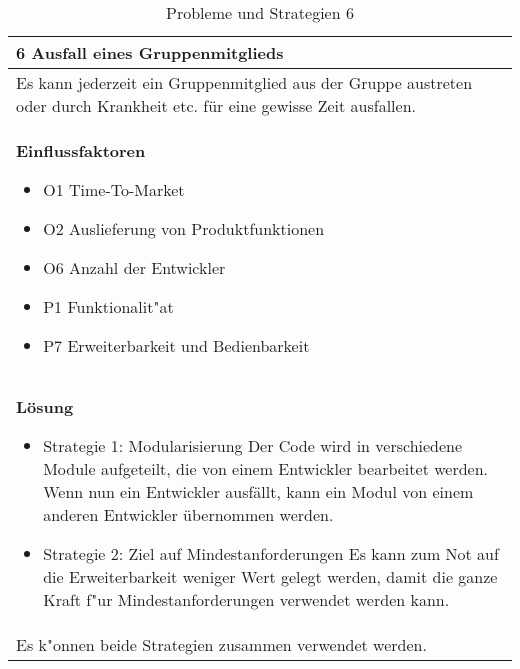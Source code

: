 \begin{table}[H]
\caption{Probleme und Strategien 6}
\begin{tabular}{|p{\textwidth}|}\hline
6 Ausfall eines Gruppenmitglieds\\ \hline
Es kann jederzeit ein Gruppenmitglied aus der Gruppe austreten oder durch Krankheit etc. für eine gewisse Zeit ausfallen.\\ \hline
\textbf{Einflussfaktoren}
\begin{itemize}
\item O1 Time-To-Market
\item O2 Auslieferung von Produktfunktionen
\item O6 Anzahl der Entwickler
\item P1 Funktionalit"at
\item P7 Erweiterbarkeit und Bedienbarkeit
\end{itemize}\\ \hline
\textbf{Lösung}
\begin{itemize}
\item Strategie 1: Modularisierung \leavevmode\newline
Der Code wird in verschiedene Module aufgeteilt, die von einem Entwickler bearbeitet werden. Wenn nun ein Entwickler ausfällt, kann ein Modul von einem anderen Entwickler übernommen werden.
\item Strategie 2: Ziel auf Mindestanforderungen \leavevmode\newline
Es kann zum Not auf die Erweiterbarkeit weniger Wert gelegt werden, damit die ganze Kraft f"ur Mindestanforderungen verwendet werden kann.
\end{itemize} \\ \hline
Es k"onnen beide Strategien zusammen verwendet werden.
\end{tabular}
\end{table}

